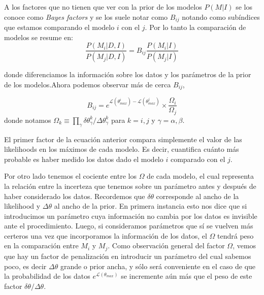 \documentclass[aps,onecolumn,12pt,notitlepage]{revtex4-2}
\begin{document}
A los factores que no tienen que ver con la prior de los modelos $P(M|I)$ se los conoce como \textit{Bayes factors} y se los suele notar como $B_{ij}$ notando como subíndices que estamos comparando el modelo $i$ con el $j$. Por lo tanto la comparación de modelos se resume en:
\begin{equation}
\frac{P(M_{i}|D,I)}{P(M_{j}|D,I)} = B_{ij} \frac{P(M_{i}|I)}{P(M_{j}|I)}
\end{equation}

donde diferenciamos la información sobre los datos y los parámetros de la prior de los modelos.Ahora podemos observar más de cerca $B_{ij}$,

\begin{equation}
B_{ij} = e^{\mathcal{L}(\theta^{i}_{max}) - \mathcal{L}(\theta^{j}_{max})} \times \frac{\Omega_{i}}{\Omega_{j}}
\end{equation}
donde notamos $\Omega_{k} \equiv \prod_{\gamma} \delta \theta^{k}_{\gamma}/\Delta \theta^{k}_{\gamma}$ para $k = i,j$ y $\gamma = \alpha, \beta$.

El primer factor de la ecuación anterior compara simplemente el valor de las likelihoods en los máximos de cada modelo. Es decir, cuantifica cuánto más probable es haber medido los datos dado el modelo $i$ comparado con el $j$. 

Por otro lado tenemos el cociente entre los $\Omega$ de cada modelo, el cual representa la relación entre la incerteza que tenemos sobre un parámetro antes y después de haber considerado los datos. Recordemos que $\delta \theta$ corresponde al ancho de la likelihood  y $\Delta\theta$ al ancho de la prior.  En primera instancia esto nos dice que si introducimos un parámetro cuya información no cambia por los datos es invisible ante el procedimiento. Luego, si consideramos parámetros que sí se vuelven más certeros una vez que incorporamos la información de los datos, el $\Omega$ tendrá peso en la comparación entre $M_{i}$ y $M_{j}$. Como observación general del factor $\Omega$, vemos que hay un factor de penalización en introducir un parámetro del cual sabemos poco, es decir $\Delta\theta$ grande o prior ancha, y sólo será conveniente en el caso de que la probabilidad de los datos $e^{\mathcal{L}(\theta_{max})}$ se incremente aún más que el peso de este factor $\delta \theta / \Delta \theta$. 
\end{document}
